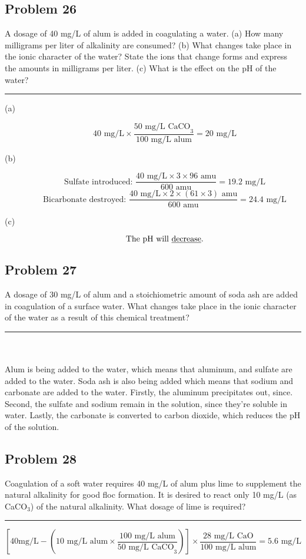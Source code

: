 \subsection*{Problem 26}
A dosage of 40 mg/L of alum is added in coagulating a water. (a) How many milligrams per liter of alkalinity are consumed? (b) What changes take place in the ionic character of the water? State the ions that change forms and express the amounts in milligrams per liter. (c) What is the effect on the pH of the water?
\\\rule{5cm}{1pt}
\begin{description}
    \item[(a)]
    \[40\text{ mg/L}\times\frac{50\text{ mg/L CaCO}_3}{100 \text{ mg/L alum}}=\boxed{20\text{ mg/L}}\]
    \item[(b)]
    \[\text{Sulfate introduced: }\frac{40\text{ mg/L}\times3\times96\text{ amu}}{600\text{ amu}}=\boxed{19.2\text{ mg/L}}\]
    \[\text{Bicarbonate destroyed: }\frac{40\text{ mg/L}\times2\times(61\times3)\text{ amu}}{600\text{ amu}}=\boxed{24.4\text{ mg/L}}\]
    \item[(c)]
    \[\text{The pH will \underline{decrease}.}\]
\end{description}
\subsection*{Problem 27}
A dosage of 30 mg/L of alum and a stoichiometric amount of soda ash are added in coagulation of a surface water. What changes take place in the ionic character of the water as a result of this chemical treatment?
\\\rule{5cm}{1pt}
\\\\Alum is being added to the water, which means that aluminum, and sulfate are added to the water. Soda ash is also being added which means that sodium and carbonate are added to the water. Firstly, the aluminum precipitates out, since. Second, the sulfate and sodium remain in the solution, since they're soluble in water. Lastly, the carbonate is converted to carbon dioxide, which reduces the pH of the solution.
\subsection*{Problem 28}
Coagulation of a soft water requires 40 mg/L of alum plus lime to supplement the natural alkalinity for good floc formation. It is desired to react only 10 mg/L (as CaC\(\text{O}_3\)) of the natural alkalinity. What dosage of lime is required?
\\\rule{5cm}{1pt}
\[\left[40\text{mg/L}-\left(10\text{ mg/L alum}\times\frac{100 \text{ mg/L alum}}{50\text{ mg/L CaCO}_3}\right)\right]\times\frac{28\text{ mg/L CaO}}{100 \text{ mg/L alum}}=\boxed{5.6 \text{ mg/L}}\]
